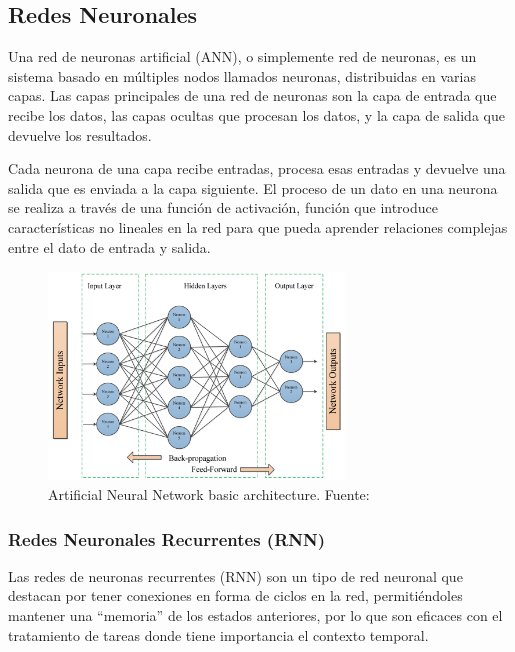 \documentclass[12pt]{report} %
\begin{document}
\subsection{Redes Neuronales}

Una red de neuronas artificial (ANN), o simplemente red de neuronas, es un sistema basado en múltiples nodos llamados neuronas, distribuidas en varias capas. Las capas principales de una red de neuronas son la capa de entrada que recibe los datos, las capas ocultas que procesan los datos, y la capa de salida que devuelve los resultados. 
\cite{annReview}

Cada neurona de una capa recibe entradas, procesa esas entradas y devuelve una salida que es enviada a la capa siguiente. El proceso de un dato en una neurona se realiza a través de una función de activación, función que introduce características no lineales en la red para que pueda aprender relaciones complejas entre el dato de entrada y salida.

\begin{figure}[h]
	\centering
	\includegraphics[width=0.7\textwidth]{annStructure.png}
	\caption{Artificial Neural Network basic architecture. Fuente: \cite{annReview}}
	\label{fig:imagen25}
\end{figure}

\subsubsection{Redes Neuronales Recurrentes (RNN)}

Las redes de neuronas recurrentes (RNN) son un tipo de red neuronal que destacan por tener conexiones en forma de ciclos en la red, permitiéndoles mantener una “memoria” de los estados anteriores, por lo que son eficaces con el tratamiento de tareas donde tiene importancia el contexto temporal. 
\cite{artInt} \cite{annReview}
\end{document}
